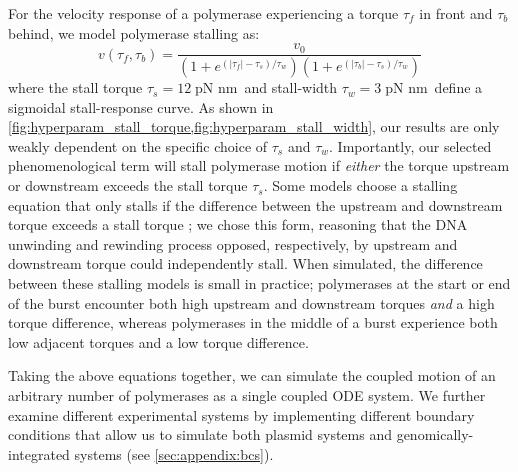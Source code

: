 \documentclass[11pt]{article}
\newcommand{\unit}[1]{\; \text{#1}\,}
\begin{document}
For the velocity response of a polymerase experiencing a torque \(\tau_f\) in front and \(\tau_b\) behind, we model polymerase stalling as:
\begin{equation}
    v(\tau_f, \tau_b) = \frac{v_0}{(1 + e^{(|\tau_f| - \tau_s)/\tau_w})(1 + e^{(|\tau_b| - \tau_s)/\tau_w})}
\label{eq:velocity_response}
\end{equation}
where the stall torque \(\tau_s = 12 \unit{pN nm}\) and stall-width \(\tau_w = 3 \unit{pN nm}\) define a sigmoidal stall-response curve.
As shown in \cref{fig:hyperparam_stall_torque,fig:hyperparam_stall_width}, our results are only weakly dependent on the specific choice of \(\tau_s\) and \(\tau_w\).
Importantly, our selected phenomenological term will stall polymerase motion if \emph{either} the torque upstream or downstream exceeds the stall torque \(\tau_s\). Some models choose a stalling equation that only stalls if the difference between the upstream and downstream torque exceeds a stall torque \parencite{tripathiDNASupercoilingmediatedCollective2021}; we chose this form, reasoning that the DNA unwinding and rewinding process opposed, respectively, by upstream and downstream torque could independently stall. When simulated, the difference between these stalling models is small in practice; polymerases at the start or end of the burst encounter both high upstream and downstream torques \emph{and} a high torque difference, whereas polymerases in the middle of a burst experience both low adjacent torques and a low torque difference.

Taking the above equations together, we can simulate the coupled motion of an arbitrary number of polymerases as a single coupled ODE system. We further examine different experimental systems by implementing different boundary conditions that allow us to simulate both plasmid systems and genomically-integrated systems (see \cref{sec:appendix:bcs}).

\end{document}
